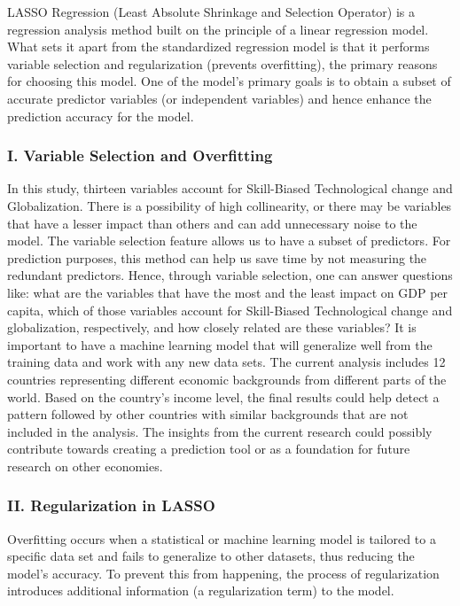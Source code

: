 \hspace{20pt}LASSO Regression (Least Absolute Shrinkage and Selection Operator) is a regression analysis method built on the principle of a linear regression model. What sets it apart from the standardized regression model is that it performs variable selection and regularization (prevents overfitting), the primary reasons for choosing this model. One of the model’s primary goals is to obtain a subset of accurate predictor variables (or independent variables) and hence enhance the prediction accuracy for the model. 

\subsubsection{I. Variable Selection and Overfitting}

\hspace{20pt}In this study, thirteen variables account for Skill-Biased Technological change and Globalization. There is a possibility of high collinearity, or there may be variables that have a lesser impact than others and can add unnecessary noise to the model. The variable selection feature allows us to have a subset of predictors. For prediction purposes, this method can help us save time by not measuring the redundant predictors. Hence, through variable selection, one can answer questions like: what are the variables that have the most and the least impact on GDP per capita, which of those variables account for Skill-Biased Technological change and globalization, respectively, and how closely related are these variables? It is important to have a machine learning model that will generalize well from the training data and work with any new data sets. The current analysis includes 12 countries representing different economic backgrounds from different parts of the world. Based on the country’s income level, the final results could help detect a pattern followed by other countries with similar backgrounds that are not included in the analysis. The insights from the current research could possibly contribute towards creating a prediction tool or as a foundation for future research on other economies.

\subsubsection{II. Regularization in LASSO}

\hspace{20pt}Overfitting occurs when a statistical or machine learning model is tailored to a specific data set and fails to generalize to other datasets, thus reducing the model’s accuracy. To prevent this from happening, the process of regularization introduces additional information (a regularization term) to the model.

